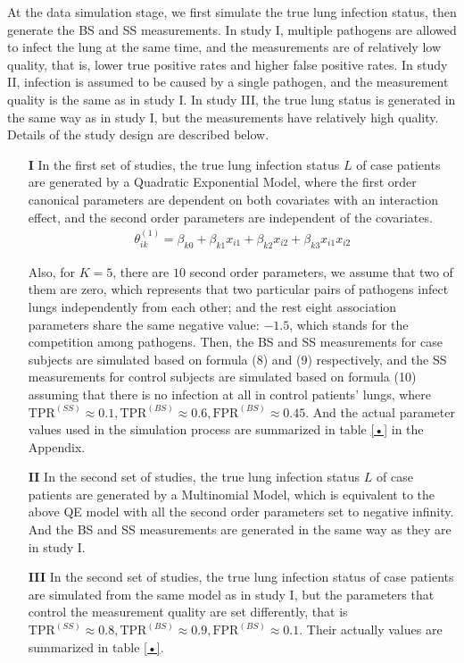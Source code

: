 \documentclass[11 pt, a4paper]{article}  %
\begin{document}
At the data simulation stage, we first simulate the true lung infection status, then generate the BS and SS measurements. In study I, multiple pathogens are allowed to infect the lung at the same time, and the measurements are of relatively low quality, that is, lower true positive rates and higher false positive rates. In study II, infection is assumed to be caused by a single pathogen, and the measurement quality is the same as in study I. In study III, the true lung status is generated in the same way as in study I, but the measurements have relatively high quality. Details of the study design are described below.

\begin{itemize}
\item[{\bf I}]
In the first set of studies, the true lung infection status $L$ of case patients are generated by a Quadratic Exponential Model, where the first order canonical parameters are dependent on both covariates with an interaction effect, and the second order parameters are independent of the covariates.
\begin{align*}
\theta^{(1)}_{ik} = \beta_{k0} + \beta_{k1} x_{i1} + \beta_{k2} x_{i2} + \beta_{k3} x_{i1} x_{i2}
\end{align*} 

Also, for $K = 5$, there are $10$ second order parameters, we assume that two of them are zero, which represents that two particular pairs of pathogens infect lungs independently from each other; and the rest eight association parameters share the same negative value: $-1.5$, which stands for the competition among pathogens. Then, the BS and SS measurements for case subjects are simulated based on formula (8) and (9) respectively, and the SS measurements for control subjects are simulated based on formula (10) assuming that there is no infection at all in control patients' lungs, where $\text{TPR}^{(SS)} \approx 0.1,  \text{TPR}^{(BS)} \approx 0.6, \text{FPR}^{(BS)} \approx 0.45$. And the actual parameter values used in the simulation process are summarized in table \ref{•} in the Appendix.

\item[{\bf II}]
In the second set of studies, the true lung infection status $L$ of case patients are generated by a Multinomial Model, which is equivalent to the above QE model with all the second order parameters set to negative infinity. And the BS and SS measurements are generated in the same way as they are in study I.

\item[{\bf III}]
In the second set of studies, the true lung infection status of case patients are simulated from the same model as in study I, but the parameters that control the measurement quality are set differently, that is $\text{TPR}^{(SS)} \approx 0.8,  \text{TPR}^{(BS)} \approx 0.9, \text{FPR}^{(BS)} \approx 0.1$. Their actually values are summarized in table \ref{•}.\\
\end{itemize}
\end{document}
